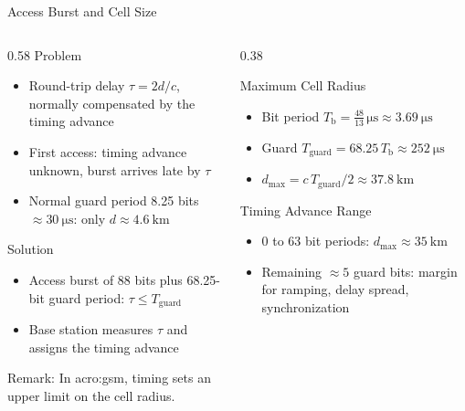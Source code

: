 \begin{frame}{Access Burst and Cell Size}
  \begin{columns}[T,onlytextwidth]
    \begin{column}{0.58\textwidth}
      Problem
      \begin{itemize}
        \item Round-trip delay $\tau = 2d/c$, normally compensated by the timing advance
        \item First access: timing advance unknown, burst arrives late by $\tau$
        \item Normal guard period \num{8.25} bits $\approx\qty{30}{\micro\second}$: only $d \approx \qty{4.6}{\kilo\meter}$
      \end{itemize}
      \vspace{0.4em}
      Solution
      \begin{itemize}
        \item Access burst of 88 bits plus \num{68.25}-bit guard period: $\tau \le T_\text{guard}$
        \item Base station measures $\tau$ and assigns the timing advance
      \end{itemize}
      \alert{Remark:} In \gls{acro:gsm}, timing sets an upper limit on the cell radius.
    \end{column}
    \begin{column}{0.38\textwidth}
      \begin{block}{Maximum Cell Radius}
        \begin{itemize}
          \item Bit period $T_\mathrm{b} = \tfrac{48}{13}\,\unit{\micro\second} \approx \qty{3.69}{\micro\second}$~\cite{etsi.145.001.v18}
          \item Guard $T_\text{guard} = 68.25\,T_\mathrm{b} \approx \qty{252}{\micro\second}$
          \item $d_\text{max} = c\,T_\text{guard}/2 \approx \qty{37.8}{\kilo\meter}$
        \end{itemize}
      \end{block}
      \begin{block}{Timing Advance Range}
        \begin{itemize}
          \item 0 to 63 bit periods: $d_\text{max} \approx \qty{35}{\kilo\meter}$
          \item Remaining $\approx 5$ guard bits: margin for ramping, delay spread, synchronization
        \end{itemize}
      \end{block}
    \end{column}
  \end{columns}
\end{frame}

